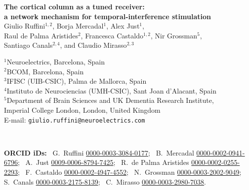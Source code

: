 \documentclass[11pt,a4paper]{article}
\newif\ifjne
\begin{document}
\ifjne
\begin{center}
{\LARGE\bfseries The cortical column as a tuned receiver:\\[4pt]
a network mechanism for temporal-interference stimulation}\\[16pt]
{\large Giulio Ruffini$^{1,2}$, Borja Mercadal$^{1}$, Alex Just$^{1}$,\\[2pt]
Raul de Palma Aristides$^{2}$, Francesca Castaldo$^{1,2}$, Nir Grossman$^{5}$,\\[2pt]
Santiago Canals$^{2,4}$, and Claudio Mirasso$^{2,3}$}\\[12pt]
\begin{minipage}{0.86\textwidth}\centering\small
$^{1}$Neuroelectrics, Barcelona, Spain\\
$^{2}$BCOM, Barcelona, Spain\\
$^{3}$IFISC (UIB-CSIC), Palma de Mallorca, Spain\\
$^{4}$Instituto de Neurociencias (UMH-CSIC), Sant Joan d'Alacant, Spain\\
$^{5}$Department of Brain Sciences and UK Dementia Research Institute,\\
Imperial College London, London, United Kingdom\\[6pt]
E-mail: \texttt{giulio.ruffini@neuroelectrics.com}
\end{minipage}\\[8pt]
\begin{minipage}{0.86\textwidth}\centering\footnotesize\color{negray}
\textbf{ORCID iDs:}\ %
G.~Ruffini \href{https://orcid.org/0000-0003-3084-0177}{0000-0003-3084-0177};\ %
B.~Mercadal \href{https://orcid.org/0000-0002-0941-6796}{0000-0002-0941-6796};\ %
A.~Just \href{https://orcid.org/0009-0006-8794-7425}{0009-0006-8794-7425};\ %
R.~de Palma Aristides \href{https://orcid.org/0000-0002-0255-2293}{0000-0002-0255-2293};\ %
F.~Castaldo \href{https://orcid.org/0000-0002-4947-4552}{0000-0002-4947-4552};\ %
N.~Grossman \href{https://orcid.org/0000-0003-2002-9049}{0000-0003-2002-9049};\ %
S.~Canals \href{https://orcid.org/0000-0003-2175-8139}{0000-0003-2175-8139};\ %
C.~Mirasso \href{https://orcid.org/0000-0003-2980-7038}{0000-0003-2980-7038}.
\end{minipage}
\end{center}
\end{document}
